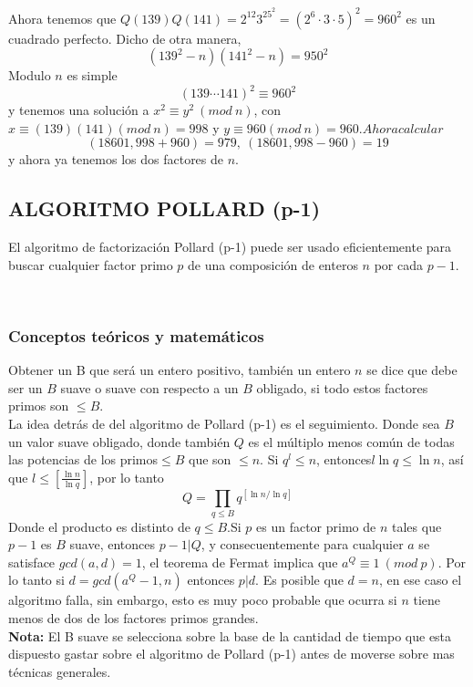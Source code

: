 \documentclass[11pt, conference]{IEEEtran}
\begin{document}
Ahora tenemos que $Q(139)Q(141)=2^{12}3^25^2=(2^6\cdot3\cdot5)^2=960^2$ es un cuadrado perfecto. Dicho de otra manera,
\[(139^2-n)(141^2-n)=950^2\]
Modulo $n$ es simple
\[(139\cdots141)^2\equiv960^2\]
y tenemos una solución a $x^2\equiv y^2\ (mod\ n)$, con $x\equiv (139)(141)(mod\ n)=998$ y $y\equiv960(mod\ n)=960. Ahora calcular$
\[(18601,998+960) = 979,\ (18601,998-960)=19\]
y ahora ya tenemos los dos factores de $n$.






\subsection[Algoritmo Pollard (p-1)]{\textbf{ALGORITMO POLLARD (p-1)}}
El algoritmo de factorización Pollard (p-1) puede ser usado eficientemente para buscar cualquier factor primo $p$ de una composición de enteros $n$ por cada $p-1$.
\cite{a}\cite{b}\cite{c}\cite{d}\cite{e}

\

\subsubsection[Conceptos teóricos y matemáticos]{\textbf{Conceptos teóricos y matemáticos}}
Obtener un B que será un entero positivo, también un entero $n$ se dice que debe ser un $B$ suave o suave con respecto a un $B$ obligado, si todo estos factores primos son $\leq B$.\\

La idea detrás de del algoritmo de Pollard (p-1) es el seguimiento. Donde sea $B$ un valor suave obligado, donde también $Q$ es el múltiplo menos común de todas las potencias de los primos$\leq B$ que son $\leq n$. Si $q^l\leq n$, entonces$l\ln q\leq\ln n$, así que $l\leq[\frac{\ln n}{\ln q}]$, por lo tanto
\[
	Q=\prod_{q\leq B}q^{[\ln n/\ln q]}
\]
Donde el producto es distinto de $q\leq B$.Si $p$ es un factor primo de $n$ tales que $p-1$ es $B$ suave, entonces  $p-1|Q$, y consecuentemente para cualquier $a$ se satisface $gcd(a,d) = 1$, el teorema de Fermat implica que $a^Q\equiv 1\ (mod\ p)$. Por lo tanto si $d = gcd(a^Q-1, n)$ entonces $p|d$. Es posible que $d = n$, en ese caso el algoritmo falla, sin embargo, esto es muy poco probable que ocurra si $n$ tiene menos de dos de los factores primos grandes.\\

\textbf{Nota:} El B suave se selecciona sobre la base de la cantidad de tiempo que esta dispuesto gastar sobre el algoritmo de Pollard (p-1) antes de moverse sobre mas técnicas generales.
\end{document}
